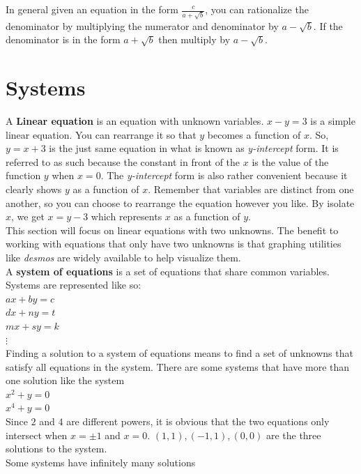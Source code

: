 \documentclass[12pt]{report}
\begin{document}
In general given an equation in the form $\frac{c}{a+\sqrt{b}}$, you can rationalize the denominator by multiplying the numerator and denominator by ${a-\sqrt{b}}$. If the denominator is in the form $a+\sqrt{b}$ then multiply by $a-\sqrt{b}$.

\section{Systems}

\hspace{\parindent}A \textbf{Linear equation} is an equation with unknown variables.
$x - y = 3$ is a simple linear equation. You can rearrange it so that $y$ becomes a function of $x$. So, $y=x+3$ is the just same equation in what is known as \textit{y-intercept} form. It is referred to as such because the constant in front of the $x$ is the value of the function $y$ when $x=0$. The \textit{y-intercept} form is also rather convenient because it clearly shows $y$ as a function of $x$. Remember that variables are distinct from one another, so you can choose to rearrange the equation however you like. By isolate $x$, we get $x=y-3$ which represents $x$ as a function of $y$.\medskip\\
This section will focus on linear equations with two unknowns. The benefit to working with equations that only have two unknowns is that graphing utilities like \textit{desmos} are widely available to help visualize them.\medskip\\
A \textbf{system of equations} is a set of equations that share common variables. Systems are represented like so:\medskip\\
$ax + by = c$\smallskip\\
$dx + ny = t$\smallskip\\
$mx + sy = k$\smallskip\\
$\vdots$\medskip\\
Finding a solution to a system of equations means to find a set of unknowns that satisfy all equations in the system. There are some systems that have more than one solution like the system\\
$x^2 + y=0$\\
$x^4+y=0$\\
Since $2$ and $4$ are different powers, it is obvious that the two equations only intersect when $x=\pm 1$ and $x=0$.
$(1, 1),(-1,1),(0,0)$ are the three solutions to the system.\\
Some systems have infinitely many solutions\\
\end{document}
